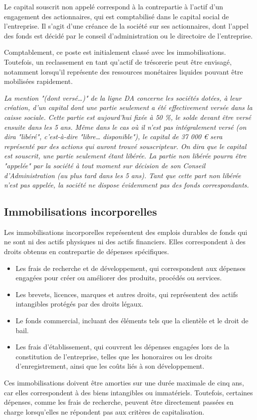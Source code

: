 \documentclass[a4paper, 12pt]{report}
\begin{document}
Le capital souscrit non appelé correspond à la contrepartie à l'actif d'un engagement des actionnaires, qui est comptabilisé dans le capital social de l'entreprise. Il s'agit d'une créance de la société sur ses actionnaires, dont l'appel des fonds est décidé par le conseil d'administration ou le directoire de l'entreprise. 

Comptablement, ce poste est initialement classé avec les immobilisations. Toutefois, un reclassement en tant qu'actif de trésorerie peut être envisagé, notamment lorsqu'il représente des ressources monétaires liquides pouvant être mobilisées rapidement.

\textit{La mention "(dont versé…)" de la ligne DA concerne les sociétés dotées, à leur
création, d’un capital dont une partie seulement a été effectivement versée dans la
caisse sociale. Cette partie est aujourd’hui fixée à 50 \%, le solde devant être versé
ensuite dans les 5 ans. Même dans le cas où il n’est pas intégralement versé (on dira
"libéré", c’est-à-dire "libre… disponible"), le capital de 37 000 € sera représenté
par des actions qui auront trouvé souscripteur. On dira que le capital est souscrit,
une partie seulement étant libérée. La partie non libérée pourra être "appelée" par
la société à tout moment sur décision de son Conseil d’Administration (au plus
tard dans les 5 ans). Tant que cette part non libérée n’est pas appelée, la société ne
dispose évidemment pas des fonds correspondants.}

\subsection{Immobilisations incorporelles}


Les immobilisations incorporelles représentent des emplois durables de fonds qui ne sont ni des actifs physiques ni des actifs financiers. Elles correspondent à des droits obtenus en contrepartie de dépenses spécifiques.

\begin{itemize}
	\item Les frais de recherche et de développement, qui correspondent aux dépenses engagées pour créer ou améliorer des produits, procédés ou services.

	\item Les brevets, licences, marques et autres droits, qui représentent des actifs intangibles protégés par des droits légaux.

	\item Le fonds commercial, incluant des éléments tels que la clientèle et le droit de bail.

	\item Les frais d’établissement, qui couvrent les dépenses engagées lors de la constitution de l’entreprise, telles que les honoraires ou les droits d’enregistrement, ainsi que les coûts liés à son développement.

\end{itemize}
Ces immobilisations doivent être amorties sur une durée maximale de cinq ans, car elles correspondent à des biens intangibles ou immatériels. Toutefois, certaines dépenses, comme les frais de recherche, peuvent être directement passées en charge lorsqu'elles ne répondent pas aux critères de capitalisation.
\end{document}
